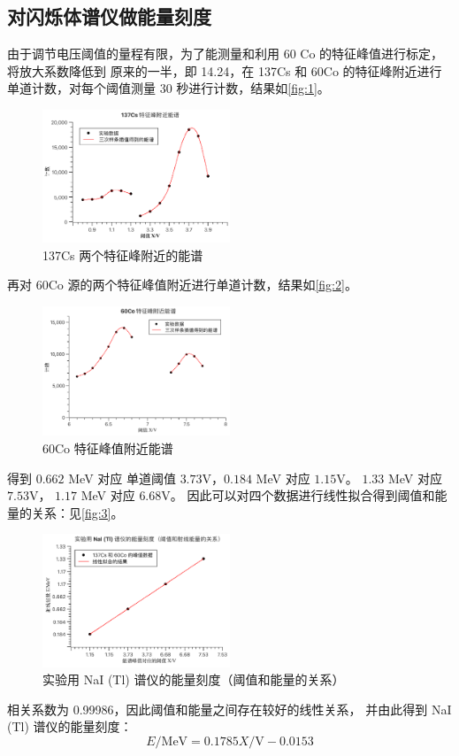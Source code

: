 \documentclass[revtex4-2]{mpltx}
\begin{document}
    \subsection{对闪烁体谱仪做能量刻度}
    由于调节电压阈值的量程有限，为了能测量和利用 60 Co 的特征峰值进行标定，将放大系数降低到
    原来的一半，即 14.24，在 137Cs 和 60Co 的特征峰附近进行单道计数，对每个阈值测量 30 秒进行计数，结果如\autoref{fig:1}。
    \begin{figure}[htbp]
        \centering
        \includegraphics[width=0.5\textwidth]{./pic3.pdf}
        \caption{137Cs 两个特征峰附近的能谱}\label{fig:1}
    \end{figure}

    再对 60Co 源的两个特征峰值附近进行单道计数，结果如\autoref{fig:2}。
    \begin{figure}[htbp]
        \centering
        \includegraphics[width=0.5\textwidth]{./pic2.pdf}
        \caption{60Co 特征峰值附近能谱}\label{fig:2}
    \end{figure}

    得到 $0.662$ MeV 对应 单道阈值 $3.73$V，$0.184$ MeV 对应 $1.15$V。
     $1.33$ MeV 对应 $7.53$V， $1.17$ MeV 对应 $6.68$V。
    因此可以对四个数据进行线性拟合得到阈值和能量的关系：见\autoref{fig:3}。
    \begin{figure}[htbp]
        \centering
        \includegraphics[width=0.5\textwidth]{./pic4.pdf}
        \caption{实验用 NaI (Tl) 谱仪的能量刻度（阈值和能量的关系）}\label{fig:3}
    \end{figure}
    相关系数为 0.99986，因此阈值和能量之间存在较好的线性关系，
    并由此得到 NaI (Tl) 谱仪的能量刻度：
    \begin{equation}
        E/\mathrm{MeV} = 0.1785 X/\mathrm{V} - 0.0153
    \end{equation}
\end{document}
